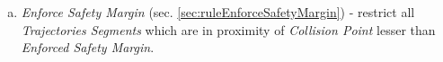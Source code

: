 \begin{enumerate}
\begin{enumerate}[a.]
        \item \emph{Enforce Safety Margin} (sec. \ref{sec:ruleEnforceSafetyMargin}) - restrict all \emph{Trajectories Segments} which are in proximity of \emph{Collision Point} lesser than \emph{Enforced Safety Margin}.
    \end{enumerate}
\end{enumerate}